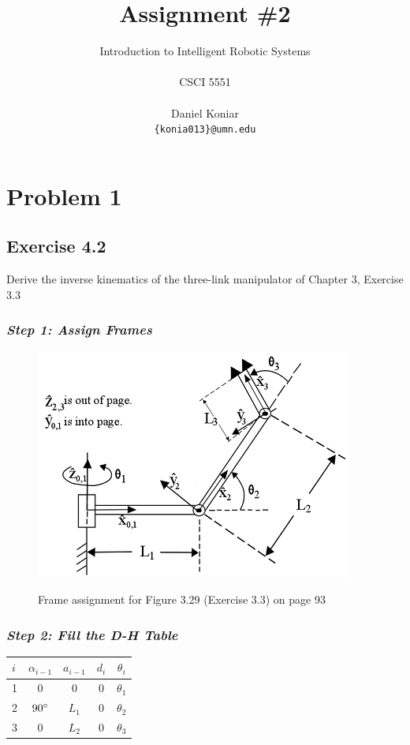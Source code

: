 \documentclass[10pt]{article}
\title{\bf Assignment \#2
}
\author{\parbox{4 in}{\centering Introduction to Intelligent Robotic Systems}\\
  CSCI 5551\\ \\
  Daniel Koniar\\
  {\tt\small \{konia013\}@umn.edu}\\
}
\begin{document}
\maketitle
\thispagestyle{empty}
\pagestyle{empty}

\section*{Problem 1}
\subsection*{Exercise 4.2}
Derive the inverse kinematics of the three-link manipulator of Chapter 3, Exercise 3.3
\subsubsection*{\textit{\textbf{Step 1: Assign Frames}}}
\begin{figure}[!h]
\centering
\includegraphics[]{Fig329}
\it{\caption{Frame assignment for Figure 3.29 (Exercise 3.3) on page 93\cite{textbook}}}
\end{figure}
\subsubsection*{\textit{\textbf{Step 2: Fill the D-H Table}}}
\begin{center}
\begin{tabular}{ l | c c c c }
  $i$ & $\alpha_{i-1}$ & $a_{i-1}$ & $d_{i}$ & $\theta_{i}$ \\
  \hline
  1   & $0$            & $0$       & $0$     & $\theta_{1}$\\ 
  2   & $90\degree$    & $L_{1}$   & $0$     & $\theta_{2}$\\
  3   & $0$            & $L_{2}$   & $0$     & $\theta_{3}$\\
\end{tabular}
\end{center}
\end{document}
